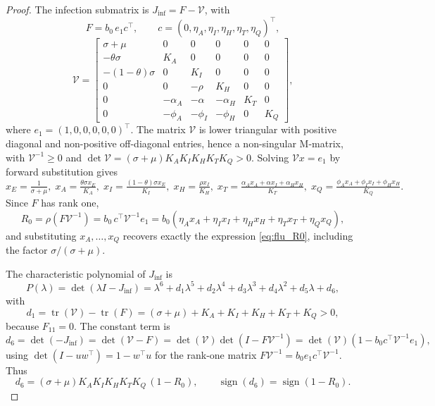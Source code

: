 \documentclass[12pt,a4paper]{article}
\theoremstyle{definition}
\theoremstyle{remark}
\begin{document}
\begin{proof}
The infection submatrix is $J_{\inf}=F-\mathcal V$, with
\[
F=b_0\,e_1c^{\top},\qquad c=(0,\eta_A,\eta_I,\eta_H,\eta_T,\eta_Q)^{\top},
\]
\[
\mathcal V=
\begin{bmatrix}
\sigma+\mu&0&0&0&0&0\\
-\theta\sigma&K_A&0&0&0&0\\
-(1-\theta)\sigma&0&K_I&0&0&0\\
0&0&-\rho&K_H&0&0\\
0&-\alpha_A&-\alpha&-\alpha_H&K_T&0\\
0&-\phi_A&-\phi_I&-\phi_H&0&K_Q
\end{bmatrix},
\]
where $e_1=(1,0,0,0,0,0)^{\top}$. The matrix $\mathcal V$ is lower triangular with
positive diagonal and non-positive off-diagonal entries, hence a non-singular
M-matrix, with $\mathcal V^{-1}\ge0$ and
$\det\mathcal V=(\sigma+\mu)K_AK_IK_HK_TK_Q>0$.
Solving $\mathcal V x=e_1$ by forward substitution gives
\[
x_E=\tfrac{1}{\sigma+\mu},\;
x_A=\tfrac{\theta\sigma x_E}{K_A},\;
x_I=\tfrac{(1-\theta)\sigma x_E}{K_I},\;
x_H=\tfrac{\rho x_I}{K_H},\;
x_T=\tfrac{\alpha_Ax_A+\alpha x_I+\alpha_Hx_H}{K_T},\;
x_Q=\tfrac{\phi_Ax_A+\phi_Ix_I+\phi_Hx_H}{K_Q}.
\]
Since $F$ has rank one,
\begin{equation}\label{eq:R0_rank1}
R_0=\rho(F\mathcal V^{-1})=b_0\,c^{\top}\mathcal V^{-1}e_1
=b_0\left(\eta_Ax_A+\eta_Ix_I+\eta_Hx_H+\eta_Tx_T+\eta_Qx_Q\right),
\end{equation}
and substituting $x_A,\dots,x_Q$ recovers exactly the expression
\eqref{eq:flu_R0}, including the factor $\sigma/(\sigma+\mu)$.


The characteristic polynomial of $J_{\inf}$ is
\[
P(\lambda)=\det(\lambda I-J_{\inf})=\lambda^6+d_1\lambda^5+d_2\lambda^4+d_3\lambda^3+d_4\lambda^2+d_5\lambda+d_6,
\]
with
\[
d_1=\operatorname{tr}(\mathcal V)-\operatorname{tr}(F)=(\sigma+\mu)+K_A+K_I+K_H+K_T+K_Q>0,
\]
because $F_{11}=0$. The constant term is
\[
d_6=\det(-J_{\inf})=\det(\mathcal V-F)=\det(\mathcal V)\det\!\left(I-F\mathcal V^{-1}\right)
=\det(\mathcal V)\left(1-b_0c^{\top}\mathcal V^{-1}e_1\right),
\]
using $\det(I-uw^{\top})=1-w^{\top}u$ for the rank-one matrix
$F\mathcal V^{-1}=b_0e_1c^{\top}\mathcal V^{-1}$. Thus
\begin{equation}\label{eq:d6_flu}
d_6=(\sigma+\mu)K_AK_IK_HK_TK_Q\,(1-R_0),
\qquad \operatorname{sign}(d_6)=\operatorname{sign}(1-R_0).
\end{equation}


\end{proof}
\end{document}
